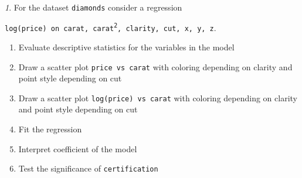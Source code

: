 \documentclass[12pt]{article}
\theoremstyle{remark}
\newtheorem{problem}{}[section]
\begin{document}
\begin{problem}
For the dataset \texttt{diamonds} consider a regression
\begin{center}
	\texttt{log(price) on carat, carat\textsuperscript{2}, clarity, cut, x, y, z}.
\end{center}
\begin{enumerate}
	\item Evaluate descriptive statistics for the variables in the model
	\item Draw a scatter plot \texttt{price vs carat} with coloring 
	depending on clarity and point style depending on cut
	\item Draw a scatter plot \texttt{log(price) vs carat} with coloring 
	depending on clarity and point style depending on cut
	\item Fit the regression
	\item Interpret coefficient of the model
	\item Test the significance of \texttt{certification}
\end{enumerate}
\end{problem}
\end{document}
